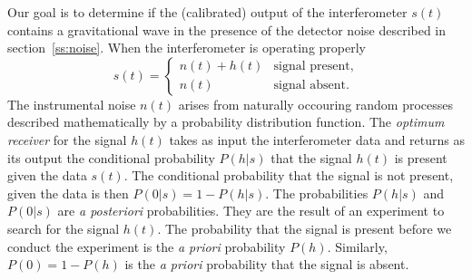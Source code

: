 Our goal is to determine if the (calibrated) output of the interferometer
$s(t)$ contains a gravitational wave in the presence of the detector noise
described in section~\ref{ss:noise}. When the interferometer is operating
properly
\begin{equation}
s(t) = \begin{cases}
n(t) + h(t) & \text{signal present},\\
n(t) & \text{signal absent}.
\end{cases}
\end{equation}
The instrumental noise $n(t)$ arises from naturally occouring random processes
described mathematically by a probability distribution function. The
\emph{optimum receiver} for the signal $h(t)$ takes as input the
interferometer data and returns as its output the conditional probability
$P(h|s)$ that the signal $h(t)$ is present given the data $s(t)$. The
conditional probability that the signal is not present, given the data is then
$P(0|s) = 1 - P(h|s)$. The probabilities $P(h|s)$ and $P(0|s)$ are \emph{a
posteriori} probabilities. They are the result of an experiment to
search for the signal $h(t)$. The probability that the
signal is present before we conduct the experiment is the \emph{a priori}
probability $P(h)$. Similarly, $P(0) = 1 - P(h)$ is the \emph{a priori}
probability that the signal is absent.

